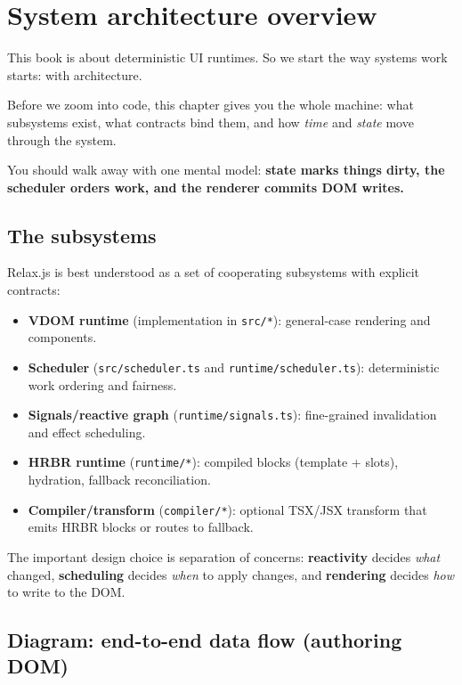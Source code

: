 \chapter{System architecture overview}
\label{ch:system-architecture}

This book is about deterministic UI runtimes.
So we start the way systems work starts: with architecture.

Before we zoom into code, this chapter gives you the whole machine:
what subsystems exist, what contracts bind them, and how \emph{time} and \emph{state} move through the system.

You should walk away with one mental model:
	\textbf{state marks things dirty, the scheduler orders work, and the renderer commits DOM writes.}

\section{The subsystems}

Relax.js is best understood as a set of cooperating subsystems with explicit contracts:

\begin{itemize}
  \item \textbf{VDOM runtime} (implementation in \texttt{src/*}): general-case rendering and components.
  \item \textbf{Scheduler} (\texttt{src/scheduler.ts} and \texttt{runtime/scheduler.ts}): deterministic work ordering and fairness.
  \item \textbf{Signals/reactive graph} (\texttt{runtime/signals.ts}): fine-grained invalidation and effect scheduling.
  \item \textbf{HRBR runtime} (\texttt{runtime/*}): compiled blocks (template + slots), hydration, fallback reconciliation.
  \item \textbf{Compiler/transform} (\texttt{compiler/*}): optional TSX/JSX transform that emits HRBR blocks or routes to fallback.
\end{itemize}

The important design choice is separation of concerns:
	\textbf{reactivity} decides \emph{what} changed, \textbf{scheduling} decides \emph{when} to apply changes, and \textbf{rendering} decides \emph{how} to write to the DOM.

\section{Diagram: end-to-end data flow (authoring \textrightarrow DOM)}

